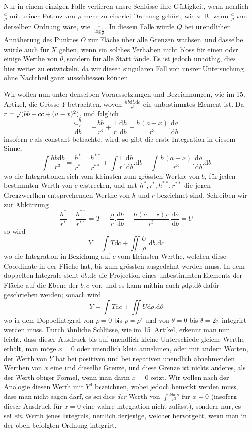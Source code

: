 Nur in einem einzigen Falle verlieren unsre Schlüsse ihre Gültigkeit, wenn nemlich $\frac a\rho$ mit keiner Potenz von $\rho$ mehr zu einerlei Ordnung gehört, wie z. B. wenn $\frac a\rho$ von derselben Ordnung wäre, wie $\frac{1}{\log\frac1\rho}$. In diesem Falle würde $Q$ bei unendlicher Annäherung des Punktes $O$ zur Fläche über alle Grenzen wachsen, und dasselbe würde auch für $X$ gelten, wenn ein solches Verhalten nicht bloss für einen oder einige Werthe von $\theta$, sondern für alle Statt fände. Es ist jedoch unnöthig, dies hier weiter zu entwickeln, da wir diesen singulären Fall von unsrer Untersuchung ohne Nachtheil ganz ausschliessen können.

Wir wollen nun unter denselben Voraussetzungen und Bezeichnungen, wie im 15. Artikel, die Grösse $Y$ betrachten, wovon $\frac{hb\mathrm db.\mathrm dc}{r^3}$ ein unbestimmtes Element ist. Da $r=\mathord{{}^{}\!\surd}(bb+cc+(a-x)^2)$, und folglich
\[
\frac{\mathrm d\frac hr}{\mathrm db}=-\frac{hb}{r^3}+\frac1r.\frac{\mathrm dh}{\mathrm db}-\frac{h(a-x)}{r^3}.\frac{\mathrm da}{\mathrm db}
\]
insofern $c$ als constant betrachtet wird, so gibt die erste Integration in diesem Sinne,
\[
\int\frac{hb\mathrm db}{r^3}=\frac{h^*}{r^*}-\frac{h^{**}}{r^{**}}+\int\frac1r.\frac{\mathrm dh}{\mathrm db}.\mathrm db-\int\frac{h(a-x)}{r^3}.\frac{\mathrm da}{\mathrm db}.\mathrm db
\]
wo die Integrationen sich vom kleinsten zum grössten Werthe von $b$, für jeden bestimmten Werth von $c$ erstrecken, und mit $h^*,r^*,h^{**},r^{**}$ die jenen Grenzwerthen entsprechenden Werthe von $h$ und $r$ bezeichnet sind, Schreiben wir zur Abkürzung
\[
\frac{h^*}{r^*}-\frac{h^{**}}{r^{**}}=T,\quad\frac\rho r.\frac{\mathrm dh}{\mathrm db}-\frac{h(a-x)\rho}{r^3}.\frac{\mathrm da}{\mathrm db}=U
\]
so wird
\[
Y=\int T\mathrm dc+\iint\frac U\rho.\mathrm db.\mathrm dc
\]
%
wo die Integration in Beziehung auf $c$ vom kleinsten Werthe, welchen diese Coordinate in der Fläche hat, bis zum grössten ausgedehnt werden muss. In dem doppelten Integrale stellt $\mathrm db.\mathrm dc$ die Projection eines unbestimmten Elements der Fläche auf die Ebene der $b,c$ vor, und es kann mithin auch $\rho\mathrm d\rho.\mathrm d\theta$ dafür geschrieben werden; sonach wird
\[
Y=\int T\mathrm dc+\iint U\mathrm d\rho.\mathrm d\theta
\]
wo in dem Doppelintegral von $\rho=0$ bis $\rho=\rho'$ und von $\theta=0$ bis $\theta=2\pi$ integrirt werden muss. Durch ähnliche Schlüsse, wie im 15. Artikel, erkennt man nun leicht, dass dieser Ausdruck bis auf unendlich kleine Unterschiede gleiche Werthe erhält, man möge $x=0$ oder unendlich klein annehmen, oder mit andern Worten, der Werth von $Y$ hat bei positiven und bei negativen unendlich abnehmenden Werthen von $x$ eine und dieselbe Grenze, und diese Grenze ist nichts anderes, als der Werth obiger Formel, wenn man darin $x=0$ setzt. Wir wollen nach der Analogie diesen Werth mit $Y^0$ bezeichnen, wobei jedoch bemerkt werden muss, dass man nicht sagen darf, es sei dies \textit{der} Werth von $\int\frac{kb\mathrm ds}{r^3}$ für $x=0$ (insofern dieser Ausdruck für $x=0$ eine wahre Integration nicht zulässt), sondern nur, es sei \textit{ein} Werth jenes Integrals, nemlich derjenige, welcher hervorgeht, wenn man in der oben befolgten Ordnung integrirt.

